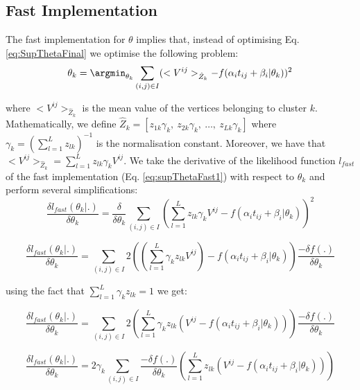 \subsection{Fast Implementation}

The fast implementation for $\theta$ implies that, instead of optimising Eq. \ref{eq:SupThetaFinal} we optimise the following problem:
\begin{equation}
\label{eq:supThetaFast1}
 \theta_k = \argmin_{\theta_k} \sum_{(i,j) \in I} (<V^{ij}>_{\hat{Z}_k} - f(\alpha_i t_{ij} + \beta_i | \theta_k))^2
\end{equation}

where $<V^{ij}>_{\hat{Z}_k}$ is the mean value of the vertices belonging to cluster $k$. Mathematically, we define $\hat{Z}_k = [z_{1k}\gamma_k,\ z_{2k}\gamma_k,\ \dots,\ z_{Lk}\gamma_k ]$ where  $\gamma_k = (\sum_{l=1}^L z_{lk})^{-1}$ is the normalisation constant. Moreover, we have that ${<V^{ij}>_{\hat{Z}_k} = \sum_{l=1}^L z_{lk} \gamma_k V^{ij}}$. We take the derivative of the likelihood function $l_{fast}$ of the fast implementation (Eq. \ref{eq:supThetaFast1}) with respect to $\theta_k$ and perform several simplifications:
\begin{equation}
\frac{\delta l_{fast}(\theta_k|.)}{\delta \theta_k} = \frac{\delta}{\delta \theta_k} \sum_{(i,j) \in I} \left( \sum_{l=1}^L z_{lk} \gamma_k V^{ij} - f(\alpha_i t_{ij} + \beta_i | \theta_k) \right)^2
\end{equation}

\begin{equation}
\frac{\delta l_{fast}(\theta_k|.)}{\delta \theta_k} = \sum_{(i,j) \in I} 2 \left( \left( \sum_{l=1}^L \gamma_k z_{lk} V^{ij} \right) - f(\alpha_i t_{ij} + \beta_i | \theta_k) \right) \frac{-\delta f(.)}{\delta \theta_k}
\end{equation}

using the fact that $\sum_{l=1}^L \gamma_k z_{lk} = 1$ we get:

\begin{equation}
\frac{\delta l_{fast}(\theta_k|.)}{\delta \theta_k} = \sum_{(i,j) \in I} 2 \left( \sum_{l=1}^L \gamma_k z_{lk} \left( V^{ij} - f(\alpha_i t_{ij} + \beta_i | \theta_k) \right) \right) \frac{-\delta f(.)}{\delta \theta_k}
\end{equation}

\begin{equation}
\frac{\delta l_{fast}(\theta_k|.)}{\delta \theta_k} = 2 \gamma_k \sum_{(i,j) \in I} \frac{-\delta f(.)}{\delta \theta_k} \left( \sum_{l=1}^L z_{lk} \left( V^{ij} - f(\alpha_i t_{ij} + \beta_i | \theta_k) \right) \right)
\end{equation}

